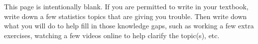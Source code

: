 
\D{\newpage}

This page is intentionally blank. If you are permitted to write in your textbook, write down a few statistics topics that are giving you trouble. Then write down what you will do to help fill in those knowledge gaps, such as working a few extra exercises, watching a few videos online to help clarify the topic(s), etc.
